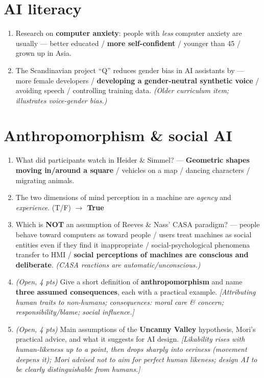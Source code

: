\documentclass[11pt, oneside]{book}
\begin{document}
\section{AI literacy}

\begin{enumerate}[leftmargin=1.6em, itemsep=4pt]
\item Research on \textbf{computer anxiety}: people with \emph{less} computer
anxiety are usually — better educated / \textbf{more self-confident} / younger
than 45 / grown up in Asia.
\item The Scandinavian project ``Q'' reduces gender bias in AI assistants by —
more female developers / \textbf{developing a gender-neutral synthetic voice} /
avoiding speech / controlling training data. \emph{(Older curriculum item;
illustrates voice-gender bias.)}
\end{enumerate}

\section{Anthropomorphism \& social AI}

\begin{enumerate}[leftmargin=1.6em, itemsep=4pt]
\item What did participants watch in Heider \& Simmel? —
\textbf{Geometric shapes moving in/around a square} / vehicles on a map /
dancing characters / migrating animals.
\item The two dimensions of mind perception in a machine are \emph{agency} and
\emph{experience}. (T/F) \hfill\textbf{$\to$ True}
\item Which is \textbf{NOT} an assumption of Reeves \& Nass' CASA paradigm? —
people behave toward computers as toward people / users treat machines as
social entities even if they find it inappropriate / social-psychological
phenomena transfer to HMI / \textbf{social perceptions of machines are conscious
and deliberate}. \emph{(CASA reactions are automatic/unconscious.)}
\item \emph{(Open, 4 pts)} Give a short definition of \textbf{anthropomorphism}
and name \textbf{three assumed consequences}, each with a practical example.
\emph{[Attributing human traits to non-humans; consequences: moral care \&
concern; responsibility/blame; social influence.]}
\item \emph{(Open, 4 pts)} Main assumptions of the \textbf{Uncanny Valley}
hypothesis, Mori's practical advice, and what it suggests for AI design.
\emph{[Likability rises with human-likeness up to a point, then drops sharply
into eeriness (movement deepens it); Mori advised \emph{not} to aim for perfect
human likeness; design AI to be clearly distinguishable from humans.]}
\end{enumerate}
\end{document}
